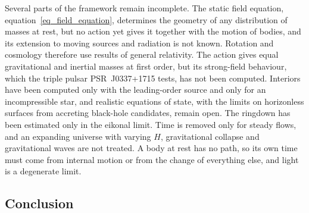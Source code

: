 \documentclass{iopjournal}
\begin{document}
Several parts of the framework remain incomplete. The static field equation, equation~\eqref{eq_field_equation}, determines the geometry of any distribution of masses at rest, but no action yet gives it together with the motion of bodies, and its extension to moving sources and radiation is not known. Rotation and cosmology therefore use results of general relativity. The action gives equal gravitational and inertial masses at first order, but its strong-field behaviour, which the triple pulsar PSR~J0337+1715 tests, has not been computed. Interiors have been computed only with the leading-order source and only for an incompressible star, and realistic equations of state, with the limits on horizonless surfaces from accreting black-hole candidates, remain open. The ringdown has been estimated only in the eikonal limit. Time is removed only for steady flows, and an expanding universe with varying $H$, gravitational collapse and gravitational waves are not treated. A body at rest has no path, so its own time must come from internal motion or from the change of everything else, and light is a degenerate limit.

\subsection{Conclusion}
\end{document}
